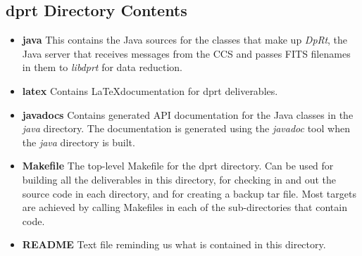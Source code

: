 \documentclass[10pt,a4paper]{article}
\begin{document}
\subsection{dprt Directory Contents}
\begin{itemize}
\item {\bf java} This contains the Java sources for the classes that make up {\em DpRt}, the Java server that 
receives messages from the CCS and passes FITS filenames in them to {\em libdprt} for data reduction.
\item {\bf latex} Contains \LaTeX documentation for dprt deliverables.
\item {\bf javadocs} Contains generated API documentation for the Java classes in the {\em java} directory. The 
documentation is generated using the {\em javadoc} tool when the {\em java} directory is built.
\item {\bf Makefile} The top-level Makefile for the dprt directory. Can be used for building all the
deliverables in this directory, for checking in  and out the source code in each directory, and for creating a 
backup tar file. Most targets are achieved by calling Makefiles in each of the sub-directories that contain code.
\item {\bf README} Text file reminding us what is contained in this directory.
\end{itemize}
\end{document}
